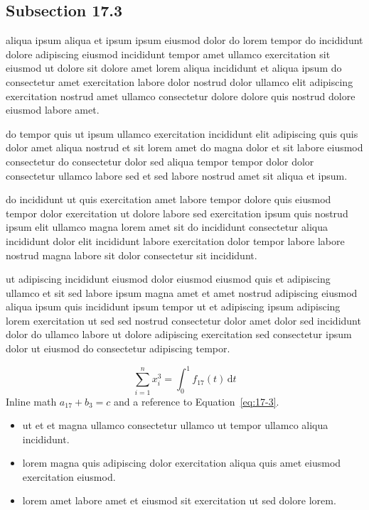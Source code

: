 \documentclass{article}
\begin{document}
\subsection{Subsection 17.3}\label{sec:17-3}
aliqua ipsum aliqua et ipsum ipsum eiusmod dolor do lorem tempor do incididunt dolore adipiscing eiusmod incididunt tempor amet ullamco exercitation sit eiusmod ut dolore sit dolore amet lorem aliqua incididunt et aliqua ipsum do consectetur amet exercitation labore dolor nostrud dolor ullamco elit adipiscing exercitation nostrud amet ullamco consectetur dolore dolore quis nostrud dolore eiusmod labore amet.

do tempor quis ut ipsum ullamco exercitation incididunt elit adipiscing quis quis dolor amet aliqua nostrud et sit lorem amet do magna dolor et sit labore eiusmod consectetur do consectetur dolor sed aliqua tempor tempor dolor dolor consectetur ullamco labore sed et sed labore nostrud amet sit aliqua et ipsum.

do incididunt ut quis exercitation amet labore tempor dolore quis eiusmod tempor dolor exercitation ut dolore labore sed exercitation ipsum quis nostrud ipsum elit ullamco magna lorem amet sit do incididunt consectetur aliqua incididunt dolor elit incididunt labore exercitation dolor tempor labore labore nostrud magna labore sit dolor consectetur sit incididunt.

ut adipiscing incididunt eiusmod dolor eiusmod eiusmod quis et adipiscing ullamco et sit sed labore ipsum magna amet et amet nostrud adipiscing eiusmod aliqua ipsum quis incididunt ipsum tempor ut et adipiscing ipsum adipiscing lorem exercitation ut sed sed nostrud consectetur dolor amet dolor sed incididunt dolor do ullamco labore ut dolore adipiscing exercitation sed consectetur ipsum dolor ut eiusmod do consectetur adipiscing tempor.

\begin{equation}\label{eq:17-3}
  \sum_{i=1}^{n} x_i^{3} = \int_0^1 f_{17}(t)\,\mathrm{d}t
\end{equation}
Inline math $a_{17} + b_{3} = c$ and a reference to Equation~\eqref{eq:17-3}.

\begin{itemize}
  \item ut et et magna ullamco consectetur ullamco ut tempor ullamco aliqua incididunt.
  \item lorem magna quis adipiscing dolor exercitation aliqua quis amet eiusmod exercitation eiusmod.
  \item lorem amet labore amet et eiusmod sit exercitation ut sed dolore lorem.
\end{itemize}
\end{document}
